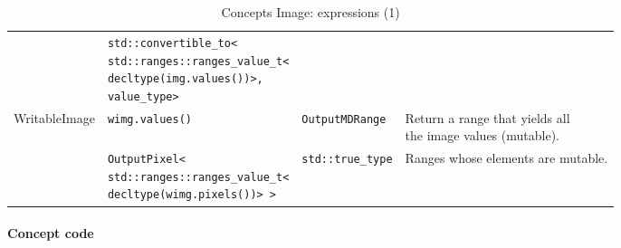 \begin{table}[htbp]
\begin{scriptsize}
\begin{tabular}{llll}
      \multicolumn{1}{c|}{}                               & \makecell[l]{\texttt{std::convertible\_to<}                                                                                             \\\texttt{std::ranges::ranges\_value\_t<} \\\texttt{decltype(img.values())>,} \\\texttt{value\_type>}} &      &  \\
      \cline{1-4}
      \multicolumn{1}{c|}{\multirow{2}{*}{WritableImage}} & \texttt{wimg.values()}                      & \texttt{OutputMDRange}                      & \makecell[l]{Return a range that yields all \\ the image values (mutable).} \\
      \multicolumn{1}{c|}{}                               & \makecell[l]{\texttt{OutputPixel<}                                                                                                      \\\texttt{std::ranges::ranges\_value\_t<} \\\texttt{decltype(wimg.pixels())> >}} & \texttt{std::true\_type}     & \multirow{2}{*}{Ranges whose elements are mutable.} \\
      \cline{1-4}
    \end{tabular}
    \smallskip

    \caption{Concepts Image: expressions (1)}
  \end{scriptsize}
  \label{table:concept.image.expressions.1}
\end{table}

\paragraph{Concept code}

